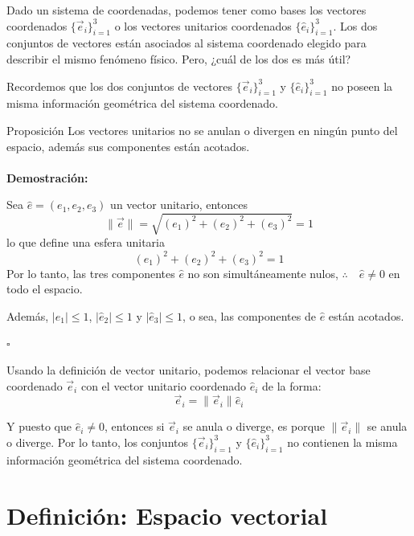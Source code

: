 \documentclass[../apunte_mecanica_clasica.tex]{subfiles}%
\begin{document}
Dado un sistema de coordenadas, podemos tener como bases los vectores coordenados $\{\vec{e}_i\}_{i=1}^3$ o los vectores unitarios coordenados $\{\hat{e}_i\}_{i=1}^3$. Los dos conjuntos de vectores están asociados al sistema coordenado elegido para describir el mismo fenómeno físico. Pero, ¿cuál de los dos es más útil?

Recordemos que los dos conjuntos de vectores $\{\vec{e}_i\}_{i=1}^3$ y $\{\hat{e}_i\}_{i=1}^3$ no poseen la misma información geométrica del sistema coordenado.

\begin{apuntebloque}{Proposición}
 Los vectores unitarios no se anulan o divergen en ningún punto del espacio, además sus componentes están acotados.
\\
\\
\textbf{Demostración:}

Sea $\hat{e}=\left(e_1,e_2,e_3\right)$ un vector unitario, entonces
\begin{equation*}
    \|\vec{e}\|=\sqrt{(e_1)^2+(e_2)^2+(e_3)^2} = 1
\end{equation*}
lo que define una esfera unitaria
\begin{equation*}
    (e_1)^2+(e_2)^2+(e_3)^2 = 1
\end{equation*}
Por lo tanto, las tres componentes $\hat{e}$ no son simultáneamente nulos, $\therefore \quad \hat{e}\neq0$ en todo el espacio.

Además, $|\hat{e}_1| \leq 1$, $|\hat{e}_2| \leq 1$ y $|\hat{e}_3| \leq 1$, o sea, las componentes de $\hat{e}$ están acotados. 

\hfill $\square$
\end{apuntebloque}

Usando la definición de vector unitario, podemos relacionar el vector base coordenado $\vec{e}_i$ con el vector unitario coordenado $\hat{e}_i$ de la forma:
\begin{equation*}
\vec{e}_i = \|\vec{e}_i\| \hat{e}_i
\end{equation*}

Y puesto que $\hat{e}_i \neq 0$, entonces si $\vec{e}_i$ se anula o diverge, es porque $\|\vec{e}_i\|$ se anula o diverge. Por lo tanto, los conjuntos $\{\vec{e}_i\}_{i=1}^3$ y $\{\hat{e}_i\}_{i=1}^3$ no contienen la misma información geométrica del sistema coordenado.

\section{Definición: Espacio vectorial}
\end{document}

